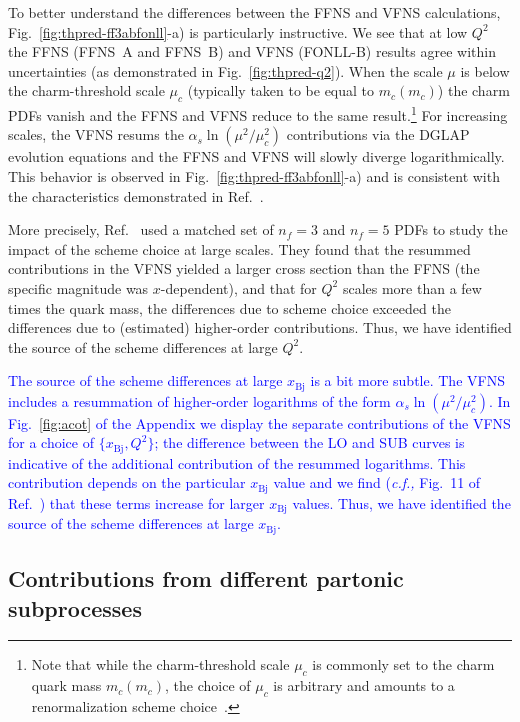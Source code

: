 \documentclass[pdftex,twocolumn,epjc3]{svjour3}          %
\newcommand{\xbj}{\ensuremath{x_{\text{Bj}}}\xspace}
\newcommand{\fonll} {{FONLL-B}\xspace}
\newcommand{\ffns} {{FFNS~A}\xspace}
\newcommand{\ffnsb} {{FFNS~B}\xspace}
\begin{document}
%
To better understand the differences between the FFNS and VFNS
calculations, Fig.~\ref{fig:thpred-ff3abfonll}-a) is particularly
instructive.
%
We see that at low $Q^2$ the FFNS (\ffns and \ffnsb) and VFNS
(\fonll) results agree within uncertainties (as demonstrated in 
Fig.~\ref{fig:thpred-q2}). When the scale $\mu$ is
below the charm-threshold scale $\mu_c$ (typically taken to be equal
to $m_c(m_c)$) the charm PDFs vanish and the FFNS and VFNS reduce to
the same result.\footnote{Note that while the charm-threshold scale
  $\mu_c$ is commonly set to the charm quark mass $m_c(m_c)$, the
  choice of $\mu_c$ is arbitrary and amounts to a renormalization
  scheme choice~\cite{Bertone:2017ehk}.}
%
For increasing scales, the VFNS resums the $\alpha_s\ln(\mu^2/\mu_c^2)$
contributions via the DGLAP evolution equations and the FFNS and VFNS
will slowly diverge logarithmically. This behavior is observed in
\hbox{Fig.~\ref{fig:thpred-ff3abfonll}-a)} and is consistent with the
characteristics demonstrated in Ref.~\cite{Kusina:2013slm}.

More precisely, Ref.~\cite{Kusina:2013slm} used a matched set of
$n_f=3$ and $n_f=5$ PDFs to study the impact of the scheme choice at
large scales. They found that the resummed contributions in the VFNS
yielded a larger cross section than the FFNS (the specific magnitude
was $x$-dependent), and that for $Q^2$ scales more than a few times
the quark mass, the differences due to scheme choice exceeded the
differences due to (estimated) higher-order
contributions.
%
Thus, we have identified the source of the scheme differences at large $Q^2$.

\textcolor{blue}{
The  source of the scheme differences at large $\xbj$ is a bit more subtle. 
The VFNS includes a resummation of higher-order logarithms of the form $\alpha_s \ln(\mu^2/\mu_c^2 )$.
In Fig.~\ref{fig:acot} of the Appendix we display the separate contributions of the VFNS for a choice of
$\{\xbj,Q^2\}$; the difference  between the LO and SUB curves is indicative of the
additional contribution of the resummed logarithms.
This contribution depends on the particular $\xbj$ value and we find
({\it c.f.,} Fig.~11 of Ref.~\cite{Kusina:2013slm})
that these terms increase for larger $\xbj$ values. 
%
Thus, we have identified the source of the scheme differences at large $\xbj$.
}



\subsection{Contributions from different partonic subprocesses}
\label{sec:thpred-partonic}
\end{document}
